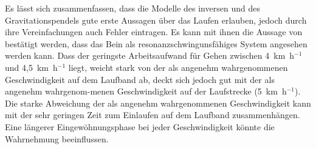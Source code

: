 Es lässt sich zusammenfassen, dass die Modelle des inversen und des Gravitationspendels gute erste Aussagen über das Laufen erlauben, jedoch durch ihre Vereinfachungen auch Fehler eintragen. Es kann mit ihnen die Aussage von \textcite{witte1992mechanische} bestätigt werden, dass das Bein als resonanzschwingunsfähiges System angesehen werden kann. Dass der geringste Arbeitsaufwand für Gehen zwischen 4~km~h$^{-1}$ \parencite{cavagna1976sources} und 4,5~km~h$^{-1}$ \parencite{cavagna2000role} liegt, weicht stark von der als angenehm wahrgenommenen Geschwindigkeit auf dem Laufband ab, deckt sich jedoch gut mit der als angenehm wahrgenom-menen Geschwindigkeit auf der Laufstrecke (5~km~h$^{-1}$). Die starke Abweichung der als angenehm wahrgenommenen Geschwindigkeit kann mit der sehr geringen Zeit zum Einlaufen auf dem Laufband zusammenhängen. Eine längerer Eingewöhnungsphase bei jeder Geschwindigkeit könnte die Wahrnehmung beeinflussen.

